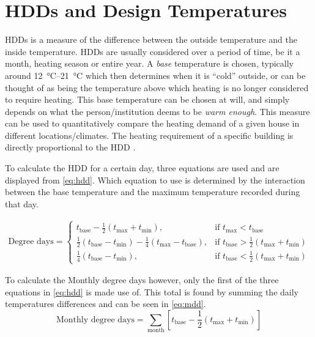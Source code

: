 \section{\acsp{HDD} and Design Temperatures} \label{sec:hddanddesign}
\acp{HDD} is a measure of the difference between the outside temperature and the inside temperature. \acp{HDD} are usually considered over a period of time, be it a month, heating season or entire year. A \textit{base} temperature is chosen, typically around \qtyrange{12}{21}{\celsius} which then determines when it is ``cold'' outside, or can be thought of as being the temperature above which heating is no longer considered to require heating. This base temperature can be chosen at will, and simply depends on what the person/institution deems to be \textit{warm enough}. This measure can be used to quantitatively compare the heating demand of a given house in different locations/climates. The heating requirement of a specific building is directly proportional to the \ac{HDD} \cite{chartered_institution_of_building_services_engineers_environmental_2006}.

To calculate  the \ac{HDD} for a certain day, three equations are used and are displayed from \cref{eq:hdd}. Which equation to use is determined by the interaction between the base temperature and the maximum temperature recorded during that day.  

\begin{align}\label{eq:hdd}
    \text{Degree days} = \begin{cases}
        t_\text{base} - \frac12(t_\text{max} + t_\text{min}), & \text{if } t_\text{max} < t_\text{base}\\
        \frac12(t_\text{base} - t_\text{min}) -\frac14(t_\text{max} -t_\text{base} ), & \text{if } t_\text{base} > \frac12(t_\text{max} + t_\text{min}) \\
        \frac14(t_\text{base} -t_\text{min} ), & \text{if } t_\text{base} <\frac12(t_\text{max} + t_\text{min})
     \end{cases}  
\end{align}

To calculate the Monthly degree days however, only the first of the three equations in \cref{eq:hdd} is made use of. This total is found by summing the daily temperatures differences and can be seen in \cref{eq:mdd}.
\begin{equation}
    \text{Monthly degree days} = \displaystyle\sum_\text{month} \left[t_\text{base} - \frac12(t_\text{max} + t_\text{min})\right] \label{eq:mdd}
\end{equation}

